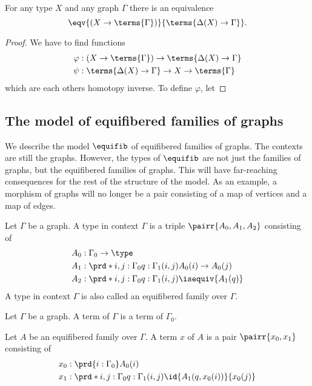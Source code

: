 \begin{lem}
For any type $X$ and any graph $\Gamma$ there is an equivalence
\begin{equation*}
\eqv{(X\to\terms{\Gamma})}{\terms{\Delta(X)\to\Gamma}}.
\end{equation*}
\end{lem}

\begin{proof}
We have to find functions
\begin{align*}
\varphi & : (X\to\terms{\Gamma})\to\terms{\Delta(X)\to\Gamma}\\
\psi & : \terms{\Delta(X)\to\Gamma}\to X\to\terms{\Gamma}
\end{align*}
which are each others homotopy inverse. To define $\varphi$, let
\end{proof}
\endgroup

\subsection{The model of equifibered families of graphs}
We describe the model $\equifib$ of equifibered families of graphs. The contexts
are still the graphs. However, the types of $\equifib$ are not just the
families of graphs, but the equifibered families of graphs. This will have
far-reaching consequences for the rest of the structure of the model. As an
example, a morphism of graphs will no longer be a pair consisting of a map of
vertices and a map of edges.

\begin{defn}
Let $\Gamma$ be a graph. A type in context $\Gamma$ is a triple 
$\pairr{A_0,A_1,A_2}$ consisting of
\begin{align*}
A_0 & : \Gamma_0\to\type\\
A_1 & : \prd*{i,j:\Gamma_0}{q:\Gamma_1(i,j)}A_0(i)\to A_0(j)\\
A_2 & : \prd*{i,j:\Gamma_0}{q:\Gamma_1(i,j)}\isequiv{A_1(q)}
\end{align*}
A type in context $\Gamma$ is also called an equifibered family over $\Gamma$.
\end{defn}

\begin{defn}
Let $\Gamma$ be a graph. A term of $\Gamma$ is a term of $\Gamma_0$.
\end{defn}

\begin{defn}
Let $A$ be an equifibered family over $\Gamma$. A term $x$ of $A$ is a pair
$\pairr{x_0,x_1}$ consisting of
\begin{align*}
x_0 & : \prd{i:\Gamma_0}A_0(i)\\
x_1 & : \prd*{i,j:\Gamma_0}{q:\Gamma_1(i,j)}\id{A_1(q,x_0(i))}{x_0(j)}
\end{align*}
\end{defn}


